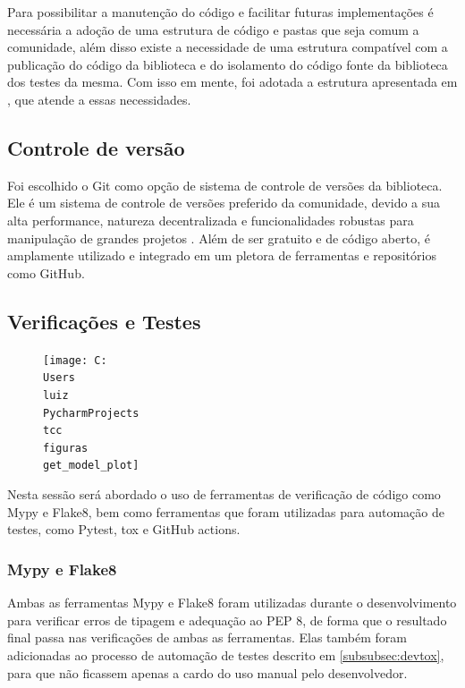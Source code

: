 Para possibilitar a manutenção do código e facilitar futuras implementações é necessária a adoção de uma
estrutura de código e pastas que seja comum a comunidade, além disso existe a necessidade de uma estrutura compatível
com a publicação do código da biblioteca e do isolamento do código fonte da biblioteca dos testes da mesma.
Com isso em mente, foi adotada a estrutura apresentada em \cite{auto_test_vid}, que atende a essas necessidades.

\subsection{Controle de versão}

Foi escolhido o Git como opção de sistema de controle de versões da biblioteca.
Ele é um sistema de controle de versões preferido da comunidade, devido a sua alta performance, natureza decentralizada
e funcionalidades robustas para manipulação de grandes projetos \cite{usegit}.
Além de ser gratuito e de código aberto, é amplamente utilizado e integrado em um pletora de ferramentas e repositórios
como GitHub.

\subsection{Verificações e Testes}
\begin{figure}
    \centering
    \texttt{[image: C:\\Users\\luiz\\PycharmProjects\\tcc\\figuras\\get\_model\_plot]}
    \caption{}
    \label{fig:}
\end{figure}
Nesta sessão será abordado o uso de ferramentas de verificação de código como Mypy e Flake8, bem como ferramentas
que foram utilizadas para automação de testes, como Pytest, tox e GitHub actions.

\subsubsection{Mypy e Flake8}
Ambas as ferramentas Mypy e Flake8 foram utilizadas durante o desenvolvimento para verificar erros de tipagem e
adequação ao PEP 8, de forma que o resultado final passa nas verificações de ambas as ferramentas.
Elas também foram adicionadas ao processo de automação de testes descrito em \ref{subsubsec:devtox}, para que não
ficassem apenas a cardo do uso manual pelo desenvolvedor.

